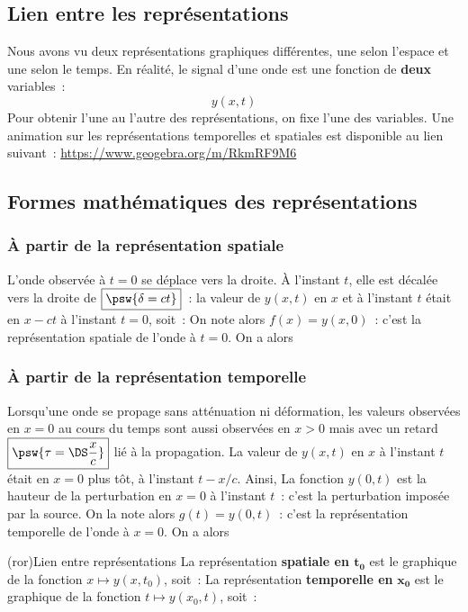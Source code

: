 \documentclass[../../main/main.tex]{subfiles}
\begin{document}
\subsection{Lien entre les représentations}
Nous avons vu deux représentations graphiques différentes, une selon l'espace et
une selon le temps. En réalité, le signal d'une onde est une fonction de
\textbf{deux} variables~:
\[y(x,t)\]
Pour obtenir l'une au l'autre des représentations, on fixe l'une des variables.
Une animation sur les représentations temporelles et spatiales est disponible au
lien suivant~: \url{https://www.geogebra.org/m/RkmRF9M6}

\subsection{Formes mathématiques des représentations}
\subsubsection{À partir de la représentation spatiale}
L'onde observée à $t=0$ se déplace vers la droite. À l'instant $t$, elle est
décalée vers la droite de $\boxed{\psw{\delta = ct}}$~: la valeur de $y(x,t)$
en $x$ et à l'instant $t$ était en $x-ct$ à l'instant $t=0$, soit~:
\psw{
	\[
		y(x,t) = y(x-ct,0)
	\]
}
On note alors $f(x) = y(x,0)$~: c'est la représentation spatiale de l'onde à
$t=0$. On a alors
\psw{
	\[\boxed{
			y(x,t) = f(x-ct)
		}\]
}\vspace{-20pt}
\subsubsection{À partir de la représentation temporelle}

Lorsqu'une onde se propage sans atténuation ni déformation, les valeurs
observées en $x = 0$ au cours du temps sont aussi observées en $x > 0$ mais avec
un retard $\boxed{\psw{\tau = \DS\frac{x}{c}}}$ lié à la propagation.
La valeur de $y(x, t)$ en $x$ à l'instant $t$ était en $x = 0$ plus tôt, à
l'instant $t - x/c$. Ainsi,
\psw{
	\[
		y(x,t) = y\left(0,t-\frac{x}{c}\right)
	\]
}
La fonction $y(0,t)$ est la hauteur de la perturbation en $x=0$ à l'instant
$t$~: c'est la perturbation imposée par la source. On la note alors $g(t) =
	y(0,t)$~: c'est la représentation temporelle de l'onde à $x=0$. On a alors
\psw{
	\[\boxed{
			y(x,t) = g\left(t-\frac{x}{c}\right)
		}\]
}

\begin{tcb}[sidebyside](ror){Lien entre représentations}
	La représentation \textbf{spatiale en $\mathbf{t_0}$} est le graphique de la
	fonction $x \mapsto y(x,t_0)$, soit~:
	\psw{%
		\[x\mapsto f(x-ct_0) = g\left(t_0 - \frac{x}{c}\right)\]
	}%
	\vspace{-15pt}
	\tcblower
	La représentation \textbf{temporelle en} $\mathbf{x_0}$ est le graphique de la
	fonction $t \mapsto y(x_0,t)$, soit~:
	\psw{%
		\[t\mapsto f(x_0-ct) = g\left(t - \frac{x_0}{c}\right)\]
	}%
\end{tcb}
\end{document}
